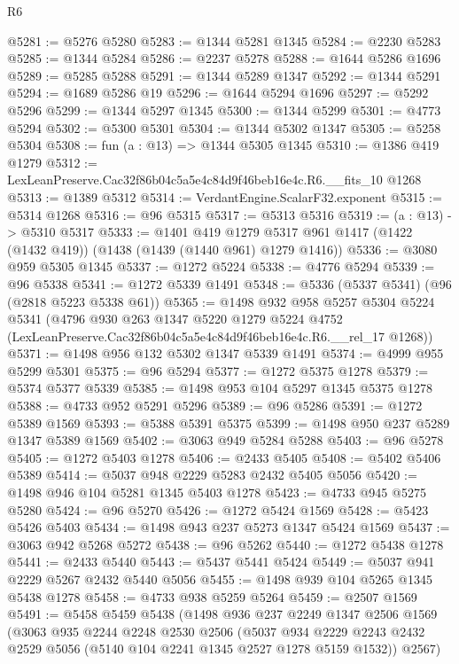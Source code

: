 \begin{lexlean}{R6}
\begin{coremodule}
@5281 := @5276 @5280
@5283 := @1344 @5281 @1345
@5284 := @2230 @5283
@5285 := @1344 @5284
@5286 := @2237 @5278
@5288 := @1644 @5286 @1696
@5289 := @5285 @5288
@5291 := @1344 @5289 @1347
@5292 := @1344 @5291
@5294 := @1689 @5286 @19
@5296 := @1644 @5294 @1696
@5297 := @5292 @5296
@5299 := @1344 @5297 @1345
@5300 := @1344 @5299
@5301 := @4773 @5294
@5302 := @5300 @5301
@5304 := @1344 @5302 @1347
@5305 := @5258 @5304
@5308 := fun (a : @13) => @1344 @5305 @1345
@5310 := @1386 @419 @1279
@5312 := LexLeanPreserve.Cac32f86b04c5a5e4c84d9f46beb16e4c.R6.__fits_10 @1268
@5313 := @1389 @5312
@5314 := VerdantEngine.ScalarF32.exponent
@5315 := @5314 @1268
@5316 := @96 @5315
@5317 := @5313 @5316
@5319 := (a : @13) -> @5310 @5317
@5333 := @1401
    @419
    @1279
    @5317
    @961
    @1417
    (@1422 (@1432 @419))
    (@1438 (@1439 (@1440 @961) @1279 @1416))
@5336 := @3080 @959 @5305 @1345
@5337 := @1272 @5224
@5338 := @4776 @5294
@5339 := @96 @5338
@5341 := @1272 @5339 @1491
@5348 := @5336 (@5337 @5341) (@96 (@2818 @5223 @5338 @61))
@5365 := @1498
    @932
    @958
    @5257
    @5304
    @5224
    @5341
    (@4796
      @930
      @263
      @1347
      @5220
      @1279
      @5224
      @4752
      (LexLeanPreserve.Cac32f86b04c5a5e4c84d9f46beb16e4c.R6.__rel_17 @1268))
@5371 := @1498 @956 @132 @5302 @1347 @5339 @1491
@5374 := @4999 @955 @5299 @5301
@5375 := @96 @5294
@5377 := @1272 @5375 @1278
@5379 := @5374 @5377 @5339
@5385 := @1498 @953 @104 @5297 @1345 @5375 @1278
@5388 := @4733 @952 @5291 @5296
@5389 := @96 @5286
@5391 := @1272 @5389 @1569
@5393 := @5388 @5391 @5375
@5399 := @1498 @950 @237 @5289 @1347 @5389 @1569
@5402 := @3063 @949 @5284 @5288
@5403 := @96 @5278
@5405 := @1272 @5403 @1278
@5406 := @2433 @5405
@5408 := @5402 @5406 @5389
@5414 := @5037 @948 @2229 @5283 @2432 @5405 @5056
@5420 := @1498 @946 @104 @5281 @1345 @5403 @1278
@5423 := @4733 @945 @5275 @5280
@5424 := @96 @5270
@5426 := @1272 @5424 @1569
@5428 := @5423 @5426 @5403
@5434 := @1498 @943 @237 @5273 @1347 @5424 @1569
@5437 := @3063 @942 @5268 @5272
@5438 := @96 @5262
@5440 := @1272 @5438 @1278
@5441 := @2433 @5440
@5443 := @5437 @5441 @5424
@5449 := @5037 @941 @2229 @5267 @2432 @5440 @5056
@5455 := @1498 @939 @104 @5265 @1345 @5438 @1278
@5458 := @4733 @938 @5259 @5264
@5459 := @2507 @1569
@5491 := @5458
    @5459
    @5438
    (@1498
      @936
      @237
      @2249
      @1347
      @2506
      @1569
      (@3063
        @935
        @2244
        @2248
        @2530
        @2506
        (@5037 @934 @2229 @2243 @2432 @2529 @5056 (@5140 @104 @2241 @1345 @2527 @1278 @5159 @1532))
        @2567)

\end{coremodule}
\end{lexlean}
